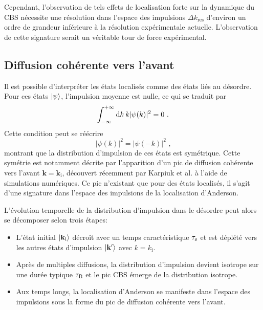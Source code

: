 Cependant, l'observation de tels effets de localisation forte sur la dynamique du CBS nécessite une résolution dans l'espace des impulsions $\Delta k_{\mathrm{res}}$ d'environ un ordre de grandeur inférieure à la résolution expérimentale actuelle. L'observation de cette signature serait un véritable tour de force expérimental.



\subsection{Diffusion cohérente vers l'avant}
Il est possible d'interpréter les états localisés comme des états liés au désordre. Pour ces états $\left| \psi \right\rangle$, l'impulsion moyenne est nulle, ce qui se traduit par
\begin{equation}
\int_{-\infty}^{+\infty}{\mathop{}\mathopen{}\mathrm{d} k \: k |\psi(k)|^2}=0 \text{ .}
\end{equation}
Cette condition peut se réécrire 
\begin{equation}
|\psi(k)|^2=|\psi(-k)|^2 \text{ ,}
\end{equation}
montrant que la distribution d'impulsion de ces états est symétrique. Cette symétrie est notamment décrite par l'apparition d'un pic de diffusion cohérente vers l'avant $\mathbf{k}=\mathbf{k}_{\mathrm{i}}$, découvert récemment par Karpiuk et al. \citep{karpiuk2012coherent} à l'aide de simulations numériques. Ce pic n'existant que pour des états localisés, il s'agit d'une signature dans l'espace des impulsions de la localisation d'Anderson.

L'évolution temporelle de la distribution d'impulsion dans le désordre peut alors se décomposer selon trois étapes:
\begin{itemize}
\item[\textendash] L'état initial $\left| \mathbf{k}_{\mathrm{i}} \right\rangle$ décroît avec un temps caractéristique $\tau_{\mathrm{s}}$ et est déplété vers les autres états d'impulsion $\left| \mathbf{k}' \right\rangle$ avec $k=k_{\mathrm{i}}$. 
\item[\textendash] Après de multiples diffusions, la distribution d'impulsion devient isotrope sur une durée typique $\tau_{\mathrm{B}}$ et le pic CBS émerge de la distribution isotrope. 
\item[\textendash] Aux temps longs, la localisation d'Anderson se manifeste dans l'espace des impulsions sous la forme du pic de diffusion cohérente vers l'avant.
\end{itemize}

